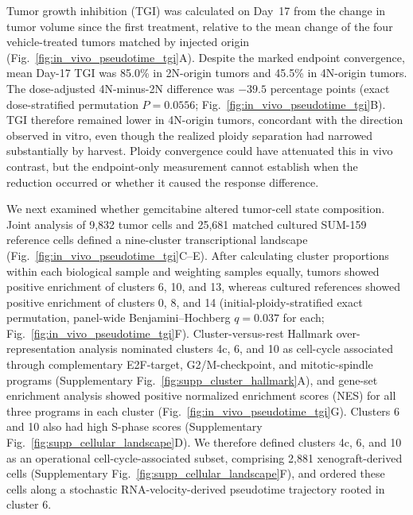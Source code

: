 \documentclass[11pt,notitlepage]{article}
\begin{document}
Tumor growth inhibition (TGI) was calculated on Day~17 from the change in tumor volume since the first treatment, relative to the mean change of the four vehicle-treated tumors matched by injected origin (Fig.~\ref{fig:in_vivo_pseudotime_tgi}A). Despite the marked endpoint convergence, mean Day-17 TGI was 85.0\% in 2N-origin tumors and 45.5\% in 4N-origin tumors. The dose-adjusted 4N-minus-2N difference was \(-39.5\) percentage points (exact dose-stratified permutation \(P=0.0556\); Fig.~\ref{fig:in_vivo_pseudotime_tgi}B). TGI therefore remained lower in 4N-origin tumors, concordant with the direction observed in vitro, even though the realized ploidy separation had narrowed substantially by harvest. Ploidy convergence could have attenuated this in vivo contrast, but the endpoint-only measurement cannot establish when the reduction occurred or whether it caused the response difference.

We next examined whether gemcitabine altered tumor-cell state composition. Joint analysis of 9,832 tumor cells and 25,681 matched cultured SUM-159 reference cells defined a nine-cluster transcriptional landscape (Fig.~\ref{fig:in_vivo_pseudotime_tgi}C--E). After calculating cluster proportions within each biological sample and weighting samples equally, tumors showed positive enrichment of clusters 6, 10, and 13, whereas cultured references showed positive enrichment of clusters 0, 8, and 14 (initial-ploidy-stratified exact permutation, panel-wide Benjamini--Hochberg \(q=0.037\) for each; Fig.~\ref{fig:in_vivo_pseudotime_tgi}F). Cluster-versus-rest Hallmark over-representation analysis nominated clusters 4c, 6, and 10 as cell-cycle associated through complementary E2F-target, G2/M-checkpoint, and mitotic-spindle programs (Supplementary Fig.~\ref{fig:supp_cluster_hallmark}A), and gene-set enrichment analysis showed positive normalized enrichment scores (NES) for all three programs in each cluster (Fig.~\ref{fig:in_vivo_pseudotime_tgi}G). Clusters 6 and 10 also had high S-phase scores (Supplementary Fig.~\ref{fig:supp_cellular_landscape}D). We therefore defined clusters 4c, 6, and 10 as an operational cell-cycle-associated subset, comprising 2,881 xenograft-derived cells (Supplementary Fig.~\ref{fig:supp_cellular_landscape}F), and ordered these cells along a stochastic RNA-velocity-derived pseudotime trajectory rooted in cluster 6.
\end{document}
